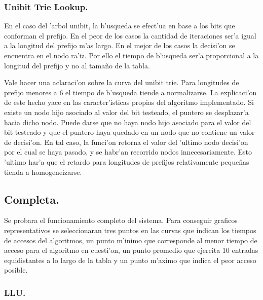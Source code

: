 \documentclass[12pt,spanish]{article}
\begin{document}
\subsubsection*{Unibit Trie Lookup.}

En el caso del 'arbol unibit, la b'usqueda se efect'ua en base a los bits que conforman el prefijo. En el peor de los casos la cantidad de iteraciones ser'a igual a la longitud del prefijo m'as largo. En el mejor de los casos la decisi'on se encuentra en el nodo ra'iz. Por ello el tiempo de b'usqueda ser'a proporcional a la longitud del prefijo y no al tama\~no de la tabla.

Vale hacer una aclaraci'on sobre la curva del unibit trie. Para longitudes de prefijo menores a 6 el tiempo de b'usqueda tiende a normalizarse. La explicaci'on de este hecho yace en las caracter'isticas propias del algoritmo implementado. Si existe un nodo hijo asociado al valor del bit testeado, el puntero se desplazar'a hacia dicho nodo. Puede darse que no haya nodo hijo asociado para el valor del bit testeado y que el puntero haya quedado en un nodo que no contiene un valor de decisi'on. En tal caso, la funci'on retorna el valor del 'ultimo nodo decisi'on por el cual se haya pasado, y se habr'an recorrido nodos innecesariamente. Esto 'ultimo har'a que el retardo para longitudes de prefijos relativamente peque\~nas tienda a homogeneizarse.

\subsection*{Completa.}

Se probara el funcionamiento completo del sistema. Para conseguir graficos representativos se seleccionaran tres puntos en las curvas que indican los tiempos de accesos del algoritmos, un punto m'inimo que corresponde al menor tiempo de acceso para el algoritmo en cuesti'on, un punto promedio que ejercita 10 entradas equidistantes a lo largo de la tabla y un punto m'aximo que indica el peor acceso posible. 

\subsubsection*{LLU.}
\end{document}
